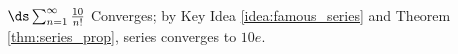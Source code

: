 {$\ds \sum_{n=1}^\infty \frac{10}{n!}$
}
{Converges; by Key Idea \ref{idea:famous_series} and Theorem \ref{thm:series_prop}, series converges to $10e$.
}